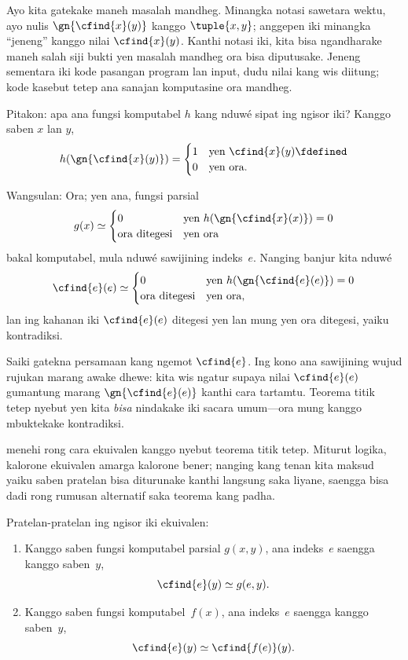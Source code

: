 \documentclass[../../../include/open-logic-section]{subfiles}
\begin{document}

Ayo kita gatekake maneh masalah mandheg. Minangka notasi
sawetara wektu, ayo nulis $\gn{\cfind{x}(y)}$ kanggo
$\tuple{x, y}$; anggepen iki minangka ``jeneng'' kanggo
nilai $\cfind{x}(y)$. Kanthi notasi iki, kita bisa
ngandharake maneh salah siji bukti yen masalah
mandheg ora bisa diputusake. Jeneng sementara iki kode pasangan program lan input, dudu nilai kang wis diitung; kode kasebut tetep ana sanajan komputasine ora mandheg.

Pitakon: apa ana fungsi komputabel $h$ kang nduwé
sipat ing ngisor iki? Kanggo saben $x$ lan $y$,
\[
h(\gn{\cfind{x}(y)}) =
\begin{cases}
1 & \text{yen $\cfind{x}(y) \fdefined$} \\
0 & \text{yen ora.}
\end{cases}
\]

Wangsulan: Ora; yen ana, fungsi parsial
\[
g(x) \simeq
\begin{cases}
0 & \text{yen $h(\gn{\cfind{x}(x)}) = 0$} \\
\text{ora ditegesi} & \text{yen ora}
\end{cases}
\]
bakal komputabel, mula nduwé sawijining indeks~$e$.
Nanging banjur kita nduwé
\[
\cfind{e}(e) \simeq
\begin{cases}
0 & \text{yen $h(\gn{\cfind{e}(e)}) = 0$} \\
\text{ora ditegesi} & \text{yen ora,}
\end{cases}
\]
lan ing kahanan iki $\cfind{e}(e)$ ditegesi yen
lan mung yen ora ditegesi, yaiku kontradiksi.

Saiki gatekna persamaan kang ngemot $\cfind{e}$.
Ing kono ana sawijining wujud rujukan marang awake
dhewe: kita wis ngatur supaya nilai $\cfind{e}(e)$
gumantung marang $\gn{\cfind{e}(e)}$ kanthi cara
tartamtu. Teorema titik tetep nyebut yen kita
{\em bisa} nindakake iki sacara umum---ora mung
kanggo mbuktekake kontradiksi.

 menehi rong cara ekuivalen
kanggo nyebut teorema titik tetep. Miturut logika,
kalorone ekuivalen amarga kalorone bener; nanging
kang tenan kita maksud yaiku saben pratelan
bisa diturunake kanthi langsung saka liyane,
saengga bisa dadi rong rumusan alternatif
saka teorema kang padha.

\begin{lem}
Pratelan-pratelan ing ngisor iki ekuivalen:
\begin{enumerate}
\item Kanggo saben fungsi komputabel parsial $g(x,y)$,
  ana indeks~$e$ saengga kanggo saben~$y$,
\[
\cfind{e}(y) \simeq g(e,y).
\]
\item Kanggo saben fungsi komputabel~$f(x)$,
  ana indeks~$e$ saengga kanggo saben~$y$,
\[
\cfind{e}(y) \simeq \cfind{f(e)}(y).
\]
\end{enumerate}
\end{lem}
\end{document}
